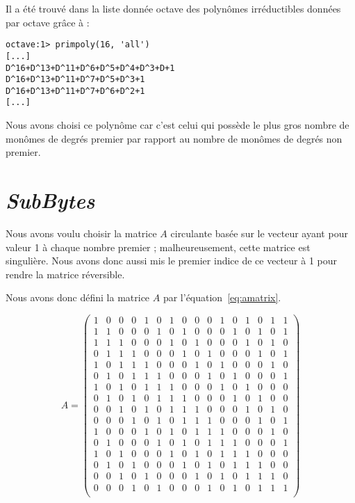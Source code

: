 \documentclass[12pt,a4paper]{report}
\begin{document}
Il a été trouvé dans la liste donnée octave des polynômes irréductibles données par octave
grâce à :

\begin{verbatim}
octave:1> primpoly(16, 'all')
[...]
D^16+D^13+D^11+D^6+D^5+D^4+D^3+D+1
D^16+D^13+D^11+D^7+D^5+D^3+1
D^16+D^13+D^11+D^7+D^6+D^2+1
[...]
\end{verbatim}

Nous avons choisi ce polynôme car c'est celui qui possède le plus gros nombre
de monômes de degrés premier par rapport au nombre de monômes de degrés non
premier.

\section{\emph{SubBytes}}

Nous avons voulu choisir la matrice $A$ circulante basée sur le vecteur ayant pour
valeur 1 à chaque nombre premier ; malheureusement, cette matrice est singulière.
Nous avons donc aussi mis le premier indice de ce vecteur à 1 pour rendre la matrice
réversible.

Nous avons donc défini la matrice $A$ par l'équation~\ref{eq:amatrix}.

\begin{equation}
\label{eq:amatrix}
A = \left(
\begin{array}{cccccccccccccccc}
1 & 0 & 0 & 0 & 1 & 0 & 1 & 0 & 0 & 0 & 1 & 0 & 1 & 0 & 1 & 1 \\
1 & 1 & 0 & 0 & 0 & 1 & 0 & 1 & 0 & 0 & 0 & 1 & 0 & 1 & 0 & 1 \\
1 & 1 & 1 & 0 & 0 & 0 & 1 & 0 & 1 & 0 & 0 & 0 & 1 & 0 & 1 & 0 \\
0 & 1 & 1 & 1 & 0 & 0 & 0 & 1 & 0 & 1 & 0 & 0 & 0 & 1 & 0 & 1 \\
1 & 0 & 1 & 1 & 1 & 0 & 0 & 0 & 1 & 0 & 1 & 0 & 0 & 0 & 1 & 0 \\
0 & 1 & 0 & 1 & 1 & 1 & 0 & 0 & 0 & 1 & 0 & 1 & 0 & 0 & 0 & 1 \\
1 & 0 & 1 & 0 & 1 & 1 & 1 & 0 & 0 & 0 & 1 & 0 & 1 & 0 & 0 & 0 \\
0 & 1 & 0 & 1 & 0 & 1 & 1 & 1 & 0 & 0 & 0 & 1 & 0 & 1 & 0 & 0 \\
0 & 0 & 1 & 0 & 1 & 0 & 1 & 1 & 1 & 0 & 0 & 0 & 1 & 0 & 1 & 0 \\
0 & 0 & 0 & 1 & 0 & 1 & 0 & 1 & 1 & 1 & 0 & 0 & 0 & 1 & 0 & 1 \\
1 & 0 & 0 & 0 & 1 & 0 & 1 & 0 & 1 & 1 & 1 & 0 & 0 & 0 & 1 & 0 \\
0 & 1 & 0 & 0 & 0 & 1 & 0 & 1 & 0 & 1 & 1 & 1 & 0 & 0 & 0 & 1 \\
1 & 0 & 1 & 0 & 0 & 0 & 1 & 0 & 1 & 0 & 1 & 1 & 1 & 0 & 0 & 0 \\
0 & 1 & 0 & 1 & 0 & 0 & 0 & 1 & 0 & 1 & 0 & 1 & 1 & 1 & 0 & 0 \\
0 & 0 & 1 & 0 & 1 & 0 & 0 & 0 & 1 & 0 & 1 & 0 & 1 & 1 & 1 & 0 \\
0 & 0 & 0 & 1 & 0 & 1 & 0 & 0 & 0 & 1 & 0 & 1 & 0 & 1 & 1 & 1 \\
\end{array}
\right)
\end{equation}
\end{document}
